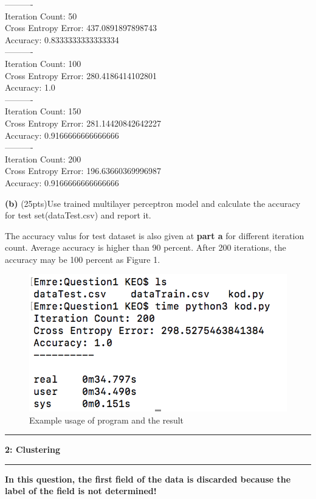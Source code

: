 \documentclass[11pt]{article}
\newcommand\question[2]{\vspace{.25in}\hrule\textbf{#1: #2}\vspace{.5em}\hrule\vspace{.10in}}
\renewcommand\part[1]{\vspace{.10in}\textbf{(#1)}}
\begin{document}
\begin{multicols}{2}
----------\\
Iteration Count: 50\\
Cross Entropy Error: 437.0891897898743\\
Accuracy: 0.8333333333333334\\
----------\\
Iteration Count: 100\\
Cross Entropy Error: 280.4186414102801\\
Accuracy: 1.0\\
----------\\
Iteration Count: 150\\
Cross Entropy Error: 281.14420842642227\\
Accuracy: 0.9166666666666666\\
----------\\
Iteration Count: 200\\
Cross Entropy Error: 196.63660369996987\\
Accuracy: 0.9166666666666666\\
\end{multicols}

\cleardoublepage

\part{b} (25pts)Use trained multilayer perceptron model and calculate the accuracy for test set(dataTest.csv) and report it.

The accuracy valus for test dataset is also given at \textbf{part a} for different iteration count. Average accuracy is higher than 90 percent. After 200 iterations, the accuracy may be 100 percent as Figure 1.

\begin{figure}[h]
	\centering
	\includegraphics[width=0.6\linewidth]{q1_result}
	\caption{Example usage of program and the result}
	\label{fig:q1_result}
\end{figure}

\question{2}{Clustering}

\textbf{In this question, the first field of the data is discarded because the label of the field is not determined!}
\end{document}
